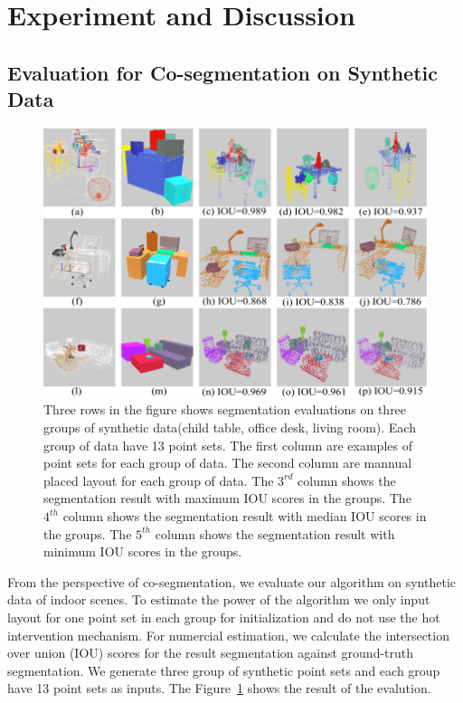 \section{Experiment and Discussion}
\subsection{Evaluation for Co-segmentation on Synthetic Data}
\begin{figure}[htb]
	\centering
	\includegraphics[width=\linewidth]{images/seg/seg}
	\caption{\label{fig:seg}Three rows in the figure shows segmentation evaluations on three groups of synthetic data(child table, office desk, living room). Each group of data have 13 point sets. The first column are examples of point sets for each group of data. The second column are mannual placed layout for each group of data. The $3^{rd}$ column shows the segmentation result with maximum IOU scores in the groups. The $4^{th}$ column shows the segmentation result with median IOU scores in the groups. The $5^{th}$ column shows the segmentation result with minimum IOU scores in the groups.}
\end{figure}
From the perspective of co-segmentation, we evaluate our algorithm on synthetic data of indoor scenes. To estimate the power of the algorithm we only input layout for one point set in each group for initialization and do not use the hot intervention mechanism. For numercial estimation, we calculate the intersection over union (IOU) scores for the result segmentation against ground-truth segmentation. We generate three group of synthetic point sets and each group have 13 point sets as inputs. The Figure~\ref{fig:seg} shows the result of the evalution.\\
